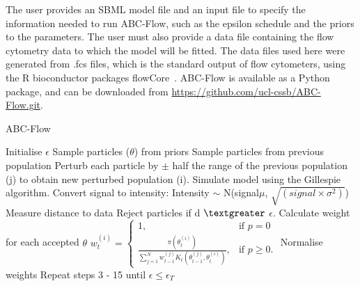 The user provides an SBML model file and an input file to specify the information needed to run ABC-Flow, such as the epsilon schedule and the priors to the parameters. The user must also provide a data file containing the flow cytometry data to which the model will be fitted. The data files used here were generated from .fcs files, which is the standard output of flow cytometers, using the R bioconductor packages flowCore~\autocite{flowCore:man}. ABC-Flow is available as a Python package, and can be downloaded from \url{https://github.com/ucl-cssb/ABC-Flow.git}. 



\begin{algorithm}[htbp]

\caption{ABC-Flow}
\label{alg:abc-flow}
 \begin{algorithmic}[1]
 	\Statex
 	
	\State Initialise $\epsilon$ 
		\State Sample particles ($\theta$) from priors
		\Else
			\State Sample particles from previous population
			\State Perturb each particle by $\pm$ half the range of the previous population (j) to obtain new perturbed population (i).
	\EndIf
	\State Simulate model using the Gillespie algorithm.
	\State Convert signal to intensity: 
					\State Intensity $\sim$ N\bigg(signal\times$\mu$,  $\sqrt{(signal\times\sigma^2)}$\bigg)
	\EndFor				
	\EndFor	
	\EndFor	
	\EndFor	
	\State Measure distance to data
	\State Reject particles if d $\textgreater$ $\epsilon$.
    \State Calculate weight for each accepted $\theta$
	\State $w_{t}^{(i)} = \begin{cases} 1, & \mbox{if } p = 0 \\\frac{\pi(\theta_{t}^{(i)})}{\sum_{j=1}^N w_{t-1}^{(j)} K_{t}(\theta_{t-1}^{(j)}, \theta_{t}^{(i)})}, & \mbox{if } p \geq  0. \end{cases}$
	\State Normalise weights
	\State Repeat steps 3 - 15 until $\epsilon \leq \epsilon_T$	%
  \end{algorithmic}
\end{algorithm}
\clearpage

